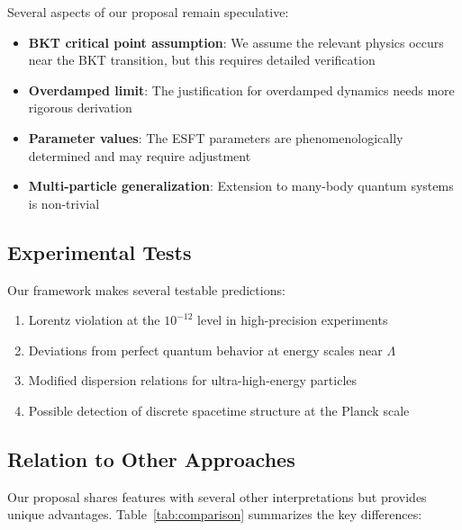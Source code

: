 ﻿\documentclass[twocolumn,showpacs,preprintnumbers,amsmath,amssymb,prd]{revtex4-2}
\begin{document}
Several aspects of our proposal remain speculative:
\begin{itemize}
\item \textbf{BKT critical point assumption}: We assume the relevant physics occurs near the BKT transition, but this requires detailed verification
\item \textbf{Overdamped limit}: The justification for overdamped dynamics needs more rigorous derivation
\item \textbf{Parameter values}: The ESFT parameters are phenomenologically determined and may require adjustment
\item \textbf{Multi-particle generalization}: Extension to many-body quantum systems is non-trivial
\end{itemize}

\subsection{Experimental Tests}

Our framework makes several testable predictions:
\begin{enumerate}
\item Lorentz violation at the $10^{-12}$ level in high-precision experiments
\item Deviations from perfect quantum behavior at energy scales near $\Lambda$
\item Modified dispersion relations for ultra-high-energy particles
\item Possible detection of discrete spacetime structure at the Planck scale
\end{enumerate}

\subsection{Relation to Other Approaches}

Our proposal shares features with several other interpretations but provides unique advantages. Table~\ref{tab:comparison} summarizes the key differences:
\end{document}
